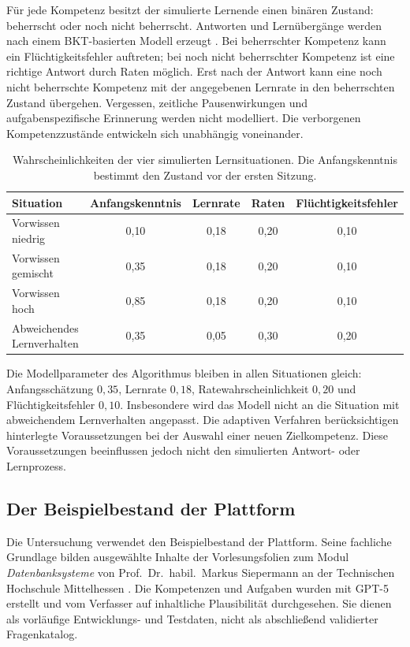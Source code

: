 Für jede Kompetenz besitzt der simulierte Lernende einen binären Zustand:
beherrscht oder noch nicht beherrscht. Antworten und Lernübergänge werden
nach einem BKT-basierten Modell erzeugt \cite{corbett1994knowledge}.
Bei beherrschter Kompetenz kann ein Flüchtigkeitsfehler auftreten; bei
noch nicht beherrschter Kompetenz ist eine richtige Antwort durch Raten
möglich. Erst nach der Antwort kann eine noch nicht beherrschte Kompetenz
mit der angegebenen Lernrate in den beherrschten Zustand übergehen.
Vergessen, zeitliche Pausenwirkungen und aufgabenspezifische Erinnerung
werden nicht modelliert. Die verborgenen Kompetenzzustände entwickeln
sich unabhängig voneinander.

\begin{table}[htbp]
  \centering
  \small
  \begin{tabular}{lcccc}
    \hline
    Situation & Anfangskenntnis & Lernrate & Raten & Flüchtigkeitsfehler \\
    \hline
    Vorwissen niedrig & 0{,}10 & 0{,}18 & 0{,}20 & 0{,}10 \\
    Vorwissen gemischt & 0{,}35 & 0{,}18 & 0{,}20 & 0{,}10 \\
    Vorwissen hoch & 0{,}85 & 0{,}18 & 0{,}20 & 0{,}10 \\
    Abweichendes Lernverhalten & 0{,}35 & 0{,}05 & 0{,}30 & 0{,}20 \\
    \hline
  \end{tabular}
  \caption{Wahrscheinlichkeiten der vier simulierten Lernsituationen.
    Die Anfangskenntnis bestimmt den Zustand vor der ersten Sitzung.}
  \label{tab:szenarien}
\end{table}

Die Modellparameter des Algorithmus bleiben in allen Situationen gleich:
Anfangsschätzung $0{,}35$, Lernrate $0{,}18$, Ratewahrscheinlichkeit
$0{,}20$ und Flüchtigkeitsfehler $0{,}10$. Insbesondere wird das Modell
nicht an die Situation mit abweichendem Lernverhalten angepasst.
Die adaptiven Verfahren berücksichtigen hinterlegte Voraussetzungen bei
der Auswahl einer neuen Zielkompetenz. Diese Voraussetzungen beeinflussen
jedoch nicht den simulierten Antwort- oder Lernprozess.

\subsection{Der Beispielbestand der Plattform}

Die Untersuchung verwendet den Beispielbestand der Plattform. Seine
fachliche Grundlage bilden ausgewählte Inhalte der Vorlesungsfolien zum
Modul \emph{Datenbanksysteme} von Prof.\ Dr.\ habil.\ Markus Siepermann
an der Technischen Hochschule Mittelhessen
\cite{siepermannDatenbanksystemeFolien}. Die Kompetenzen und Aufgaben
wurden mit GPT-5 erstellt und vom Verfasser auf inhaltliche Plausibilität
durchgesehen. Sie dienen als vorläufige Entwicklungs- und Testdaten,
nicht als abschließend validierter Fragenkatalog.

